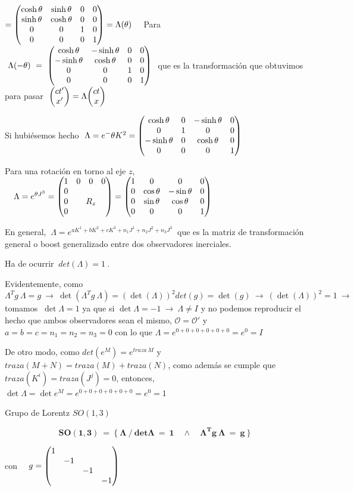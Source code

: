 $=\mqty( \cosh \theta & \sinh \theta &0&0\\ \sinh \theta & \cosh \theta &0&0\\ 0&0&1&0\\0&0&0&1) = \Lambda(\theta)\quad $
Para $\ \Lambda(-\theta) \ = \ \mqty( \cosh \theta & -\sinh \theta &0&0\\ -\sinh \theta & \cosh \theta &0&0\\ 0&0&1&0\\0&0&0&1) \ $ que es la transformación que obtuvimos para pasar $\ \mqty(ct'\\x')=\Lambda \mqty(ct\\x)$

Si hubiésemos hecho $\ \Lambda=e^-\theta K^2=\mqty( \cosh \theta &0&-\sinh \theta & 0 \\ 0&1&0&0 \\ -\sinh \theta&0&\cosh \theta &0 \\ 0&0&0&1)$

Para una rotación en torno al eje $z$, $\quad \Lambda=e^{\theta J^3} = \mqty(1 & \mqty{0&0&0}\\ \mqty{0\\0\\0} & R_z)=	\mqty( 1&0&0&0\\ 0&\cos \theta & -\sin \theta & 0 \\ 0& \sin \theta & \cos \theta & 0 \\ 0&0&0&1)$


En general, $\ \Lambda=e^{aK^1+bK^2+cK^3+n_1J^1+n_2J^2+n_3J^3}\ $ que es la matriz de transformación general o boost generalizado entre dos observadores inerciales.

\vspace{5mm} Ha de ocurrir $\ det(\Lambda)=1\ $.

Evidentemente, como $\Lambda^T g \ \Lambda =g\  \to \  \det(\Lambda^T g \ \Lambda)= (\det(\Lambda))^2 det(g)=\det (g) \ \to \  (\det(\Lambda))^2 =1 \ \to \ $ tomamos $\ \det \Lambda =1$ ya que si $\det \Lambda=-1 \ \to \ \Lambda \neq I $ y no podemos reproducir el hecho que ambos observadores sean el mismo, $\mathcal O=\mathcal O'$ y $a=b=c=n_1=n_2=n_3=0$ con lo que $\Lambda = e^{0+0+0+0+0+0}=e^0 = I$

De otro modo, como $det(e^M)=e^{traza\ M}$ y $traza(M+N)=traza(M)+traza(N)$,  como además se cumple que 
$traza(K^i)=traza(J^j)=0$, entonces, 
$\det \Lambda=\det e^M=e^{0+0+0+0+0+0}=e^0=1$

\begin{myalertblock}{Grupo de Lorentz $SO(1,3)$}

\begin{equation}
\label{T31GL}
\boldsymbol{
	SO(1,3) \ = \	\{ \ \Lambda \ / \ det \Lambda \ = \  1 \quad \wedge \quad \Lambda^T g \ \Lambda \ = \ g  \ \}
}
\end{equation}

\begin{center} \vspace{5mm}con $\quad g=\mqty(1\\&-1\\&&-1\\&&&-1)$ \end{center}
\end{myalertblock}


